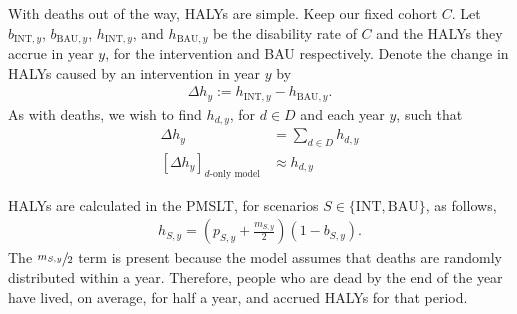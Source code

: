 \documentclass[]{article}
\begin{document}
With deaths out of the way, HALYs are simple. Keep our fixed cohort $C$. Let $b_{\text{INT}, y}$, $b_{\text{BAU}, y}$, $h_{\text{INT}, y}$, and $h_{\text{BAU}, y}$ be the disability rate of $C$ and the HALYs they accrue in year $y$, for the intervention and BAU respectively. Denote the change in HALYs caused by an intervention in year $y$ by
\begin{align*}
	\Delta h_y := h_{\text{INT}, y} - h_{\text{BAU}, y}.
\end{align*}
As with deaths, we wish to find $h_{d, y}$, for $d \in D$ and each year $y$, such that
\begin{align*}
	\Delta h_y &= \sum_{d \in D} h_{d, y} \\
	[\Delta h_y]_\text{$d$-only model} &\approx h_{d, y}
\end{align*}

HALYs are calculated in the PMSLT, for scenarios $S \in \{\text{INT}, \text{BAU}\}$, as follows,
\begin{align*}
	h_{S, y} = \left(p_{S, y} + \frac{m_{S, y}}{2}\right) (1 - b_{S, y}).
\end{align*}
The $\sfrac{m_{S, y}}{2}$ term is present because the model assumes that deaths are randomly distributed within a year. Therefore, people who are dead by the end of the year have lived, on average, for half a year, and accrued HALYs for that period.
\end{document}
